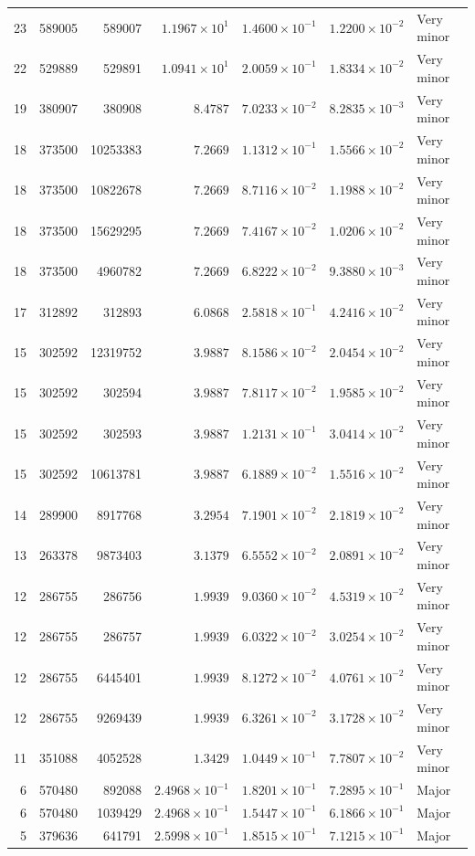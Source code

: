 \documentclass[twocolumn]{openjournal}
\begin{document}
\begin{landscape}
\begin{longtable}{rrrrrrl}
23 & 589005 & 589007 & $1.1967\times10^{1}$ & $1.4600\times10^{-1}$ & $1.2200\times10^{-2}$ & Very minor \\
22 & 529889 & 529891 & $1.0941\times10^{1}$ & $2.0059\times10^{-1}$ & $1.8334\times10^{-2}$ & Very minor \\
19 & 380907 & 380908 & $8.4787$ & $7.0233\times10^{-2}$ & $8.2835\times10^{-3}$ & Very minor \\
18 & 373500 & 10253383 & $7.2669$ & $1.1312\times10^{-1}$ & $1.5566\times10^{-2}$ & Very minor \\
18 & 373500 & 10822678 & $7.2669$ & $8.7116\times10^{-2}$ & $1.1988\times10^{-2}$ & Very minor \\
18 & 373500 & 15629295 & $7.2669$ & $7.4167\times10^{-2}$ & $1.0206\times10^{-2}$ & Very minor \\
18 & 373500 & 4960782 & $7.2669$ & $6.8222\times10^{-2}$ & $9.3880\times10^{-3}$ & Very minor \\
17 & 312892 & 312893 & $6.0868$ & $2.5818\times10^{-1}$ & $4.2416\times10^{-2}$ & Very minor \\
15 & 302592 & 12319752 & $3.9887$ & $8.1586\times10^{-2}$ & $2.0454\times10^{-2}$ & Very minor \\
15 & 302592 & 302594 & $3.9887$ & $7.8117\times10^{-2}$ & $1.9585\times10^{-2}$ & Very minor \\
15 & 302592 & 302593 & $3.9887$ & $1.2131\times10^{-1}$ & $3.0414\times10^{-2}$ & Very minor \\
15 & 302592 & 10613781 & $3.9887$ & $6.1889\times10^{-2}$ & $1.5516\times10^{-2}$ & Very minor \\
14 & 289900 & 8917768 & $3.2954$ & $7.1901\times10^{-2}$ & $2.1819\times10^{-2}$ & Very minor \\
13 & 263378 & 9873403 & $3.1379$ & $6.5552\times10^{-2}$ & $2.0891\times10^{-2}$ & Very minor \\
12 & 286755 & 286756 & $1.9939$ & $9.0360\times10^{-2}$ & $4.5319\times10^{-2}$ & Very minor \\
12 & 286755 & 286757 & $1.9939$ & $6.0322\times10^{-2}$ & $3.0254\times10^{-2}$ & Very minor \\
12 & 286755 & 6445401 & $1.9939$ & $8.1272\times10^{-2}$ & $4.0761\times10^{-2}$ & Very minor \\
12 & 286755 & 9269439 & $1.9939$ & $6.3261\times10^{-2}$ & $3.1728\times10^{-2}$ & Very minor \\
11 & 351088 & 4052528 & $1.3429$ & $1.0449\times10^{-1}$ & $7.7807\times10^{-2}$ & Very minor \\
6 & 570480 & 892088 & $2.4968\times10^{-1}$ & $1.8201\times10^{-1}$ & $7.2895\times10^{-1}$ & Major \\
6 & 570480 & 1039429 & $2.4968\times10^{-1}$ & $1.5447\times10^{-1}$ & $6.1866\times10^{-1}$ & Major \\
5 & 379636 & 641791 & $2.5998\times10^{-1}$ & $1.8515\times10^{-1}$ & $7.1215\times10^{-1}$ & Major \\

\end{longtable}
\end{landscape}
\end{document}
